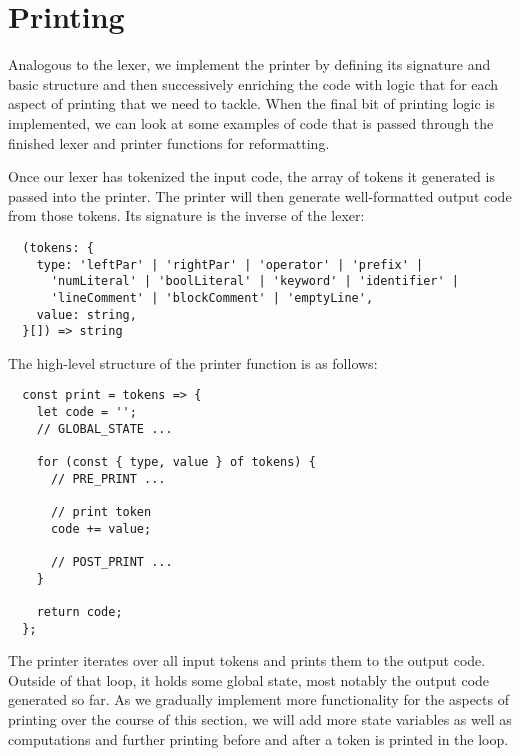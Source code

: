 \section{Printing}
Analogous to the lexer, we implement the printer by
defining its signature and basic structure
and then successively enriching the code
with logic that for each aspect of printing
that we need to tackle.
When the final bit of printing logic is implemented,
we can look at some examples of code
that is passed through the finished
lexer and printer functions for reformatting.

Once our lexer has tokenized the input code,
the array of tokens it generated is passed into the printer.
The printer will then generate well-formatted output code from those tokens.
Its signature is the inverse of the lexer:
\begin{verbatim}
  (tokens: {
    type: 'leftPar' | 'rightPar' | 'operator' | 'prefix' |
      'numLiteral' | 'boolLiteral' | 'keyword' | 'identifier' |
      'lineComment' | 'blockComment' | 'emptyLine',
    value: string,
  }[]) => string
\end{verbatim}

The high-level structure of the printer function is as follows:
\begin{verbatim}
  const print = tokens => {
    let code = '';
    // GLOBAL_STATE ...

    for (const { type, value } of tokens) {
      // PRE_PRINT ...

      // print token
      code += value;

      // POST_PRINT ...
    }

    return code;
  };
\end{verbatim}
The printer iterates over all input tokens
and prints them to the output code.
Outside of that loop, it holds some global state,
most notably the output code generated so far.
As we gradually implement
more functionality for the aspects of printing
over the course of this section,
we will add more state variables
as well as computations and further printing
before and after a token is printed in the loop.










